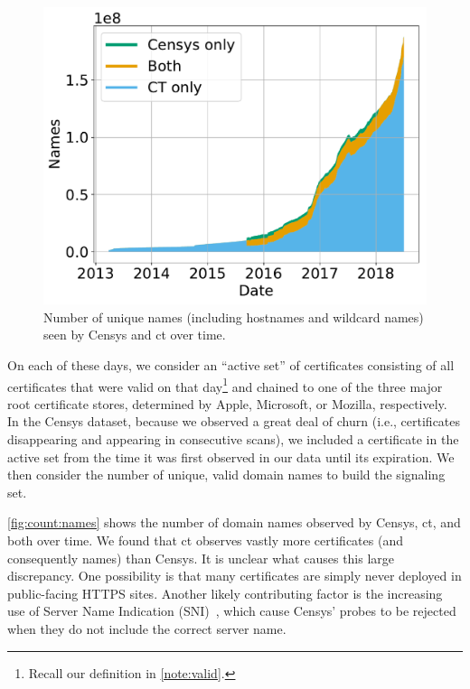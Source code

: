 \begin{figure}
  \centering
  \includegraphics[width=0.8\linewidth]{fig/name_count_valid}
  \vspace{-2mm}
  \caption{Number of unique names (including hostnames and wildcard names) seen
  by Censys and \ac{ct} over time.}
  \vspace{-5mm}
  \label{fig:count:names}
\end{figure}

On each of these days, we consider an ``active set'' of certificates consisting
of all certificates that were valid on that day\footnote{Recall our definition
in \autoref{note:valid}.} and chained to one of the three major root certificate
stores, determined by Apple, Microsoft, or Mozilla, respectively. In the Censys
dataset, because we observed a great deal of churn (i.e., certificates
disappearing and appearing in consecutive scans), we included a certificate in
the active set from the time it was first observed in our data until its
expiration. We then consider the number of unique, valid domain names to build
the signaling set.

\autoref{fig:count:names} shows the number of domain names observed by Censys,
\ac{ct}, and both over time. We found that \ac{ct} observes vastly more
certificates (and consequently names) than Censys. It is unclear what causes
this large discrepancy. One possibility is that many certificates are simply
never deployed in public-facing HTTPS sites. Another likely contributing factor
is the increasing use of Server Name Indication (SNI)~\cite{rfc6066}, which
cause Censys' probes to be rejected when they do not include the correct server
name.

